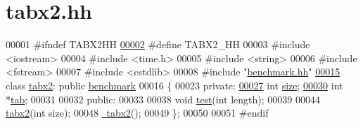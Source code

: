 \hypertarget{tabx2_8hh_source}{}\section{tabx2.\+hh}
\label{tabx2_8hh_source}

\begin{DoxyCode}
00001 \textcolor{preprocessor}{#ifndef TABX2HH}
\hypertarget{tabx2_8hh_source_l00002}{}\hyperlink{tabx2_8hh_ab76bf9329c796034d3ea1300008f135e}{00002} \textcolor{preprocessor}{#define TABX2\_HH}
00003 \textcolor{preprocessor}{#include <iostream>}
00004 \textcolor{preprocessor}{#include <time.h>}
00005 \textcolor{preprocessor}{#include <string>}
00006 \textcolor{preprocessor}{#include <fstream>}
00007 \textcolor{preprocessor}{#include <cstdlib>}
00008 \textcolor{preprocessor}{#include "\hyperlink{benchmark_8hh}{benchmark.hh}"}
\hypertarget{tabx2_8hh_source_l00015}{}\hyperlink{classtabx2}{00015} \textcolor{keyword}{class }\hyperlink{classtabx2}{tabx2}: \textcolor{keyword}{public} \hyperlink{classbenchmark}{benchmark}
00016 \{
00023 \textcolor{keyword}{private}:
\hypertarget{tabx2_8hh_source_l00027}{}\hyperlink{classtabx2_a9a6db4f12091baed13f8bad9b9538766}{00027}   \textcolor{keywordtype}{int} \hyperlink{classtabx2_a9a6db4f12091baed13f8bad9b9538766}{size};
\hypertarget{tabx2_8hh_source_l00030}{}\hyperlink{classtabx2_ae3ee40d58c1d3dc6a80c34ca63d337e9}{00030}   \textcolor{keywordtype}{int} *\hyperlink{classtabx2_ae3ee40d58c1d3dc6a80c34ca63d337e9}{tab};
00031   
00032 \textcolor{keyword}{public}:
00033   
00038   \textcolor{keywordtype}{void} \hyperlink{classtabx2_a41eea5dffaea0a866db5c574129c0ee4}{test}(\textcolor{keywordtype}{int} length);
00039   
00044   \hyperlink{classtabx2_a68be0fc6ed6ce41d56011a6f5bad1b00}{tabx2}(\textcolor{keywordtype}{int} size);
00048   \hyperlink{classtabx2_a6e259fbc3e5791ae3a11df988a8369c0}{~tabx2}();
00049 \};
00050 
00051 \textcolor{preprocessor}{#endif}
\end{DoxyCode}
